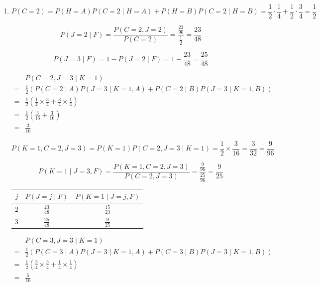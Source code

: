 \documentclass[11pt,a4paper]{article}
\begin{document}
\begin{enumerate}
    $$
    P(C=2, J=2 \mid K=3) = \frac{1}{8} + \frac{3}{8} = \frac{1}{2}
    $$

    $$
    P(K=1 \mid J=2, F) = \frac{\frac{5}{16} \cdot \frac{1}{2}}{\frac{5}{16} \cdot \frac{1}{2} + \frac{1}{2} \cdot \frac{1}{6}} = \frac{15}{23}
    $$

    \item[(b)]
    
    $$
    P(C=2) = P(H=A)P(C=2 \mid H=A) + P(H=B)P(C=2 \mid H=B) = \frac{1}{2} \cdot \frac{1}{4} + \frac{1}{2} \cdot \frac{3}{4} = \frac{1}{2}
    $$

    $$
    P(J=2 \mid F) = \frac{P(C=2, J=2)}{P(C=2)} = \frac{\frac{23}{96}}{\frac{1}{2}} = \frac{23}{48}
    $$

    $$
    P(J=3 \mid F) = 1 - P(J=2 \mid F) = 1 - \frac{23}{48} = \frac{25}{48}
    $$

    $$
    \begin{aligned}
    &P(C=2, J=3 \mid K=1) \\
    =& \frac{1}{2}\left(P(C=2 \mid A)P(J=3 \mid K=1, A) + P(C=2 \mid B)P(J=3 \mid K=1, B)\right) \\
    =& \frac{1}{2}\left(\frac{1}{4} \times \frac{3}{4} + \frac{3}{4} \times \frac{1}{4}\right) \\
    =& \frac{1}{2} \left(\frac{3}{16} + \frac{3}{16}\right) \\
    =& \frac{3}{16}
    \end{aligned}
    $$

    $$
    P(K=1, C=2, J=3)
    = P(K=1)P(C=2, J=3 \mid K=1)
    = \frac{1}{2} \times \frac{3}{16} = \frac{3}{32}
    = \frac{9}{96}
    $$

    $$
    P(K=1 \mid J=3, F)
    = \frac{P(K=1, C=2, J=3)}{P(C=2, J=3)}
    = \frac{\frac{9}{96}}{\frac{25}{96}}
    = \frac{9}{25}
    $$

    \begin{center}
    \begin{tabular}{ccc}
    \toprule $j$ & $P(J=j \mid F)$ & $P(K=1 \mid J=j, F)$ \\\midrule
    $2$ & $\frac{23}{48}$ & $\frac{15}{23}$ \\
    $3$ & $\frac{25}{48}$ & $\frac{9}{25}$ \\\bottomrule
    \end{tabular}
    \end{center}

    $$
    \begin{aligned}
    &P(C=3, J=3 \mid K=1) \\
    =& \frac{1}{2}\left(P(C=3 \mid A)P(J=3 \mid K=1, A) + P(C=3 \mid B)P(J=3 \mid K=1, B)\right) \\
    =& \frac{1}{2}\left(\frac{3}{4} \times \frac{3}{4} + \frac{1}{4} \times \frac{1}{4}\right) \\
    =& \frac{5}{16}
    \end{aligned}
    $$


\end{enumerate}
\end{document}
